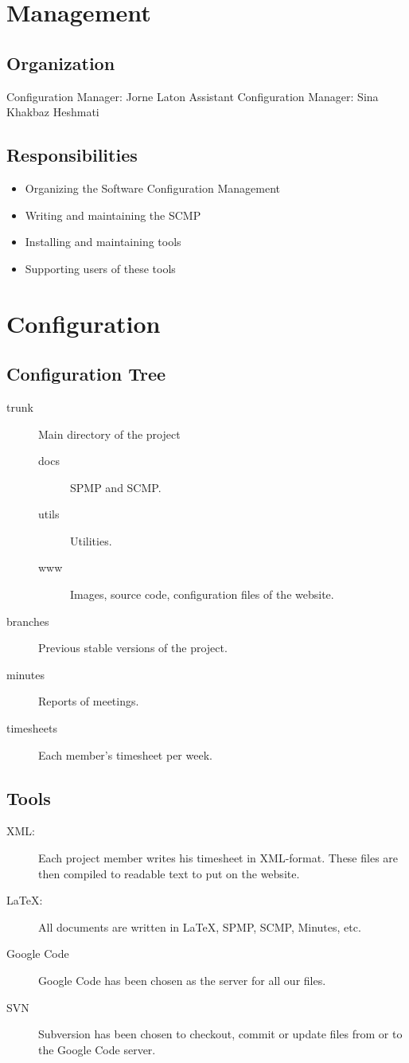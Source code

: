 \documentclass{article}
\begin{document}
\section{Management}
\subsection{Organization}
Configuration Manager: Jorne Laton\n
Assistant Configuration Manager: Sina Khakbaz Heshmati

\subsection{Responsibilities}
\begin{itemize}
\item Organizing the Software Configuration Management
\item Writing and maintaining the SCMP
\item Installing and maintaining tools
\item Supporting users of these tools
\end{itemize}


\section{Configuration}
\subsection{Configuration Tree}
\begin{description}
\item[trunk]
Main directory of the project
	\begin{description}
	\item[docs]
	SPMP and SCMP.
	\item[utils]
	Utilities.
	\item[www]
	Images, source code, configuration files of the website.
	\end{description}
\item[branches]
Previous stable versions of the project.
\item[minutes]
Reports of meetings.
\item[timesheets]
Each member's timesheet per week.
\end{description}

\subsection{Tools}
\begin{description}
\item[XML:]
	Each project member writes his timesheet in XML-format. These files are then compiled to readable text to put on the website.
\item[\LaTeX{}:]
	All documents are written in \LaTeX{}, SPMP, SCMP, Minutes, etc.
\item[Google Code]
	Google Code has been chosen as the server for all our files.
\item[SVN]
	Subversion has been chosen to checkout, commit or update files from or to the Google Code server.
\end{description}
\end{document}
